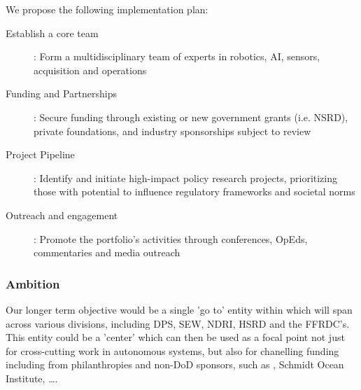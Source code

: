 \documentclass[11pt,letterpaper]{article}
\begin{document}
We propose the following implementation plan:

\begin{description}

\item[Establish a core team]: Form a multidisciplinary team of \org
  experts in robotics, AI, sensors, acquisition and operations

\item[Funding and Partnerships]: Secure funding through existing or
  new government grants (i.e. NSRD), private foundations, and industry
  sponsorships subject to review

\item[Project Pipeline]: Identify and initiate high-impact policy
  research projects, prioritizing those with potential to influence
  regulatory frameworks and societal norms
  
\item[Outreach and engagement]: Promote the portfolio’s activities
  through conferences, OpEds, commentaries and media outreach


\end{description}

\subsubsection{Ambition}

Our longer term objective would be a single 'go to' entity within \org
which will span across various divisions, including DPS, SEW, NDRI,
HSRD and the FFRDC's. This entity could be a 'center' which can then
be used as a focal point not just for cross-cutting work in autonomous
systems, but also for chanelling funding including from philanthropies
and non-DoD sponsors, such as \noae, Schmidt Ocean Institute, \ldots.
\end{document}
